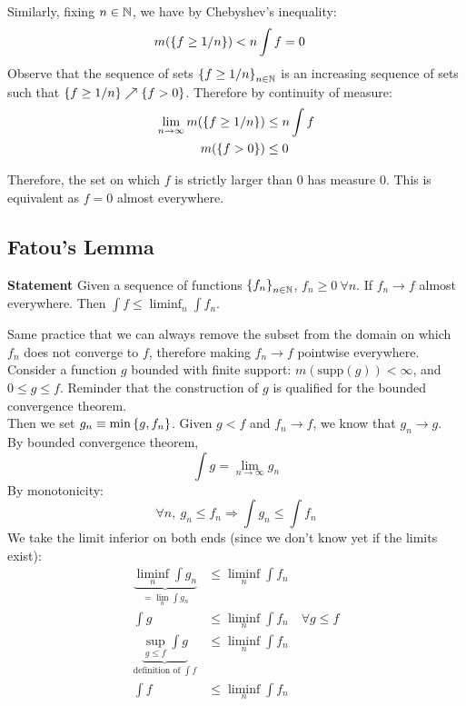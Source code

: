 \begin{prf}
Similarly, fixing $n\in \mathbb{N}$, we have by Chebyshev's inequality: 
\begin{align*}
	m(\qty{f\geq 1/n}) &< n\int f = 0
\end{align*}
Observe that the sequence of sets $\qty{f\geq 1/n}_{n\in \mathbb{N}}$ is an increasing sequence of sets such that $\qty{f\geq 1/n} \nearrow \qty{f>0}$. Therefore by continuity of measure: 
\begin{align*}
	\lim_{n\to\infty} m\qty(\qty{f\geq 1/n}) &\leq n\int f\\
	 m\qty(\qty{f>0}) &\leq 0
\end{align*}

Therefore, the set on which $f$ is strictly larger than 0 has measure 0. This is equivalent as $f = 0$ almost everywhere. 

\end{prf}

\subsection{Fatou's Lemma}
\textbf{Statement} Given a sequence of functions $\qty{f_n}_{n\in \mathbb{N}}$,  $f_n\geq 0 \ \forall n$. If $f_n\to f$ almost everywhere. Then $\int f \leq \liminf_{n} \int f_n$. \\

\begin{prf}
Same practice that we can always remove the subset from the domain on which 	$f_n$ does not converge to $f$, therefore making $f_n\to f$ pointwise everywhere.\\

Consider a function $g$ bounded with finite support: $m(\mathrm{supp}(g))<\infty$, and $0\leq g\leq f$. Reminder that the construction of $g$ is qualified for the bounded convergence theorem. \\

Then we set $g_n\equiv \min\qty{g, f_n}$. Given $g<f$ and $f_n\to f$, we know that $g_n\to g$. \\

By bounded convergence theorem, 
$$\int g = \lim_{n\to\infty} g_n$$
By monotonicity: 
$$\forall n, \ g_n \leq f_n \Rightarrow \int g_n \leq \int f_n$$
We take the limit inferior on both ends (since we don't know yet if the limits exist): 
\begin{align*}
	\underbrace{\liminf_{n}\int g_n}_{=\lim_n \int g_n} &\leq \liminf_{n}\int f_n\\
	\int g &\leq \liminf_{n}\int f_n \quad \forall g\leq f\\
	\underbrace{\sup_{g\leq f}\int g}_{\text{definition of }\int f} &\leq \liminf_{n}\int f_n\\
	\int f &\leq \liminf_{n}\int f_n 
\end{align*}

\end{prf}

